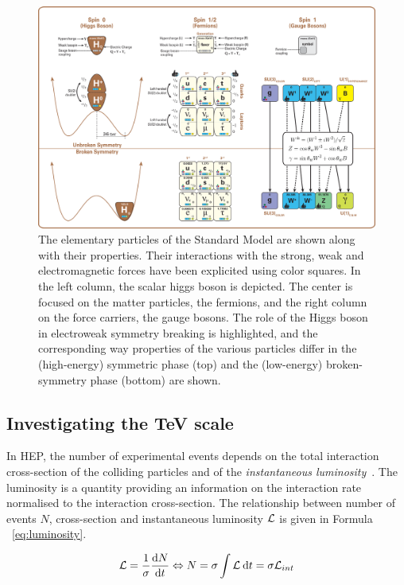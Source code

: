 	\begin{figure}[H]
		\centering
		\hspace*{-0.1\linewidth}
		\includegraphics[width=1.2\linewidth]{fig/chapt2/Standard_Model_Of_Particle_Physics.png}
		\caption{\label{fig:SM} The elementary particles of the Standard Model are shown along with their properties. Their interactions with the strong, weak and electromagnetic forces have been explicited using color squares. In the left column, the scalar higgs boson is depicted. The center is focused on the matter particles, the fermions, and the right column on the force carriers, the gauge bosons. The role of the Higgs boson in electroweak symmetry breaking is highlighted, and the corresponding way properties of the various particles differ in the (high-energy) symmetric phase (top) and the (low-energy) broken-symmetry phase (bottom) are shown.}
	\end{figure}
	
	\subsection{Investigating the TeV scale}
	\label{chapt2:ssec:TeV}
	
	In \acl{HEP}, the number of experimental events depends on the total interaction cross-section of the colliding particles and of the \textit{instantaneous luminosity}~\cite{PDG2018}. The luminosity is a quantity providing an information on the interaction rate normalised to the interaction cross-section. The relationship between number of events $N$, cross-section and instantaneous luminosity $\mathcal{L}$ is given in Formula ~\ref{eq:luminosity}.
	
	\begin{equation}
		\label{eq:luminosity}
		\mathcal{L} = \frac{1}{\sigma}\frac{\mathrm{d} N}{\mathrm{d} t} \Leftrightarrow N = \sigma \int \mathcal{L}\: \mathrm{d} t = \sigma \mathcal{L}_{int}
	\end{equation}
	
